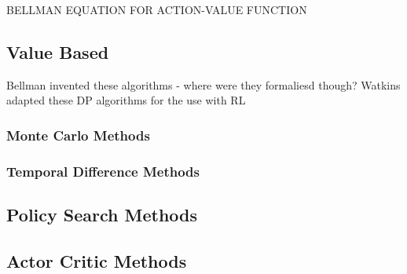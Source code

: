 BELLMAN EQUATION FOR ACTION-VALUE FUNCTION

\subsection{Value Based}
Bellman invented these algorithms - where were they formaliesd though? Watkins adapted these DP algorithms for the use with RL

\subsubsection{Monte Carlo Methods}

\subsubsection{Temporal Difference Methods}

\subsection{Policy Search Methods}

\subsection{Actor Critic Methods}